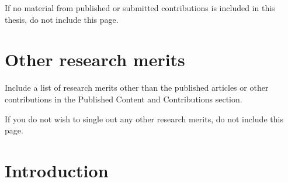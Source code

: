 \documentclass[12pt]{report} %
\begin{document}
If no material from published or submitted contributions is included in this thesis, do not include this page.

\chapter*{Other research merits}
\thispagestyle{empty}
Include a list of research merits other than the published articles or other contributions in the Published Content and Contributions section.

If you do not wish to single out any other research merits, do not include this page.


\tableofcontents
\thispagestyle{fancy}

\listoffigures
\thispagestyle{fancy}

\listoftables
\thispagestyle{fancy}

\clearpage
{} %

\chapter{Introduction}




\clearpage
{}

\printbibliography




\end{document}
